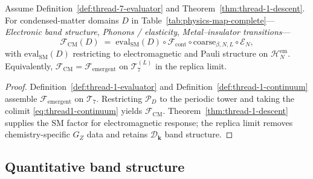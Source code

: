 \begin{proposition}
\label{prop:thread7-specialization}
Assume Definition~\ref{def:thread-7-evaluator} and
Theorem~\ref{thm:thread-1-descent}. For condensed-matter domains $D$ in
Table~\ref{tab:physics-map-complete}---\emph{Electronic band structure},
\emph{Phonons / elasticity}, \emph{Metal--insulator transitions}---
\begin{equation}\label{eq:thread7-factorization}
  \mathcal{F}_{\mathrm{CM}}(D)
  \;=\;
  \mathrm{eval}_{\mathrm{SM}}(D)
  \circ
  \mathcal{F}_{\mathrm{cont}}
  \circ
  \mathrm{coarse}_{\beta,N,L}
  \circ
  \mathcal{E}_N,
\end{equation}
with $\mathrm{eval}_{\mathrm{SM}}(D)$ restricting to electromagnetic and
Pauli structure on $\mathcal{H}_N^{\mathrm{em}}$. Equivalently,
$\mathcal{F}_{\mathrm{CM}}=\mathcal{F}_{\mathrm{emergent}}$ on
$\mathcal{T}_7^{(L)}$ in the replica limit.
\end{proposition}

\begin{proof}
Definition~\ref{def:thread-1-evaluator} and Definition~\ref{def:thread-1-continuum}
assemble $\mathcal{F}_{\mathrm{emergent}}$ on $\mathcal{T}_7$. Restricting
$\mathcal{P}_D$ to the periodic tower and taking the colimit
\eqref{eq:thread1-continuum} yields $\mathcal{F}_{\mathrm{CM}}$.
Theorem~\ref{thm:thread-1-descent} supplies the SM factor for electromagnetic
response; the replica limit removes chemistry-specific $G_Z$ data and retains
$\mathcal{D}_{\mathbf{k}}$ band structure.
\end{proof}

\subsection{Quantitative band structure}
\label{sec:wave4-thread7:bands}

